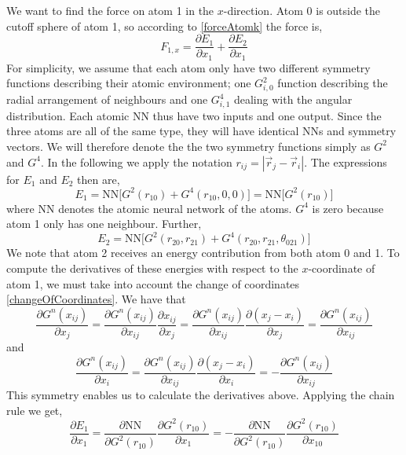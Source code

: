 \documentclass[twoside,english]{uiofysmaster}
\begin{document}
We want to find the force on atom 1 in the $x$-direction. Atom 0 is outside the cutoff sphere of atom 1, 
so according to \eqref{forceAtomk} the force is,
\begin{equation}
 F_{1,x} = \frac{\partial E_1}{\partial x_1} + \frac{\partial E_2}{\partial x_1}
\end{equation}
For simplicity, we assume that each atom only have two different symmetry functions describing their atomic environment;
one $G_{i,0}^2$ function describing the radial arrangement of neighbours and one $G_{i,1}^4$ dealing with the angular distribution.
Each atomic NN thus have two inputs and one output. 
Since the three atoms are all of the same type, they will have identical NNs and symmetry vectors. We will therefore 
denote the the two symmetry functions simply as $G^2$ and $G^4$. In the following we apply the notation
$r_{ij} = |\vec{r}_j - \vec{r}_i|$. 
The expressions for $E_1$ and $E_2$ then are,
\begin{equation}
 E_1 = \textrm{NN}\bigr[G^2(r_{10}) + G^4(r_{10},0,0)\bigr] = \textrm{NN}\bigr[G^2(r_{10})\bigr]
\end{equation}
where NN denotes the atomic neural network of the atoms. $G^4$ is zero because atom 1 only has one neighbour. Further, 
\begin{equation}
 E_2 = \textrm{NN}\bigr[G^2(r_{20}, r_{21}) + G^4(r_{20},r_{21},\theta_{021})\bigr]
\end{equation}
We note that atom 2 receives an energy contribution from both atom 0 and 1. 
To compute the derivatives of these energies with respect to the $x$-coordinate of atom 1, we
must take into account the change of coordinates \eqref{changeOfCoordinates}. We have that
\begin{equation}
 \frac{\partial G^n(x_{ij})}{\partial x_j} = \frac{\partial G^n(x_{ij})}{\partial x_{ij}}\frac{\partial x_{ij}}{\partial x_j}
 = \frac{\partial G^n(x_{ij})}{\partial x_{ij}}\frac{\partial (x_j-x_i)}{\partial x_j} = 
 \frac{\partial G^n(x_{ij})}{\partial x_{ij}}
 \label{changeOfCoordsSymmetry1}
\end{equation}
and
\begin{equation}
 \frac{\partial G^n(x_{ij})}{\partial x_i} = \frac{\partial G^n(x_{ij})}{\partial x_{ij}}\frac{\partial (x_j-x_i)}{\partial x_i} =
 -\frac{\partial G^n(x_{ij})}{\partial x_{ij}}
 \label{changeOfCoordsSymmetry2}
\end{equation}
This symmetry enables us to calculate the derivatives above. Applying the chain rule we get,
\begin{equation}
 \frac{\partial E_1}{\partial x_1} = \frac{\partial \textrm{NN}}{\partial G^2(r_{10})}
 \frac{\partial G^2(r_{10})}{\partial x_1} = 
 -\frac{\partial \textrm{NN}}{\partial G^2(r_{10})}\frac{\partial G^2(r_{10})}{\partial x_{10}}
\end{equation}
\end{document}
